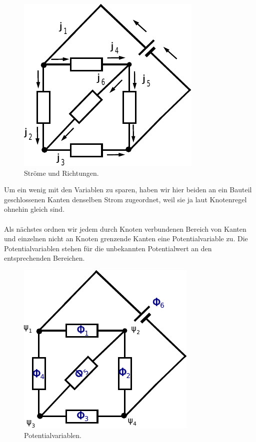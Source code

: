 \documentclass[11pt,a4paper,leqno]{report}
\numberwithin{equation}{chapter}
\begin{document}
\begin{figure}[H]
	\begin{center}
		\includegraphics[scale=0.8]{Bilder/stromkreis_2.pdf}
		\caption{Str\"ome und Richtungen.}
	\end{center}
\end{figure}
\noindent
Um ein wenig mit den Variablen zu sparen, haben wir hier beiden an ein Bauteil geschlossenen Kanten denselben Strom zugeordnet, weil sie ja laut Knotenregel ohnehin gleich sind.\\
\\
Als n\"achstes ordnen wir jedem durch Knoten verbundenen Bereich von Kanten und einzelnen nicht an Knoten grenzende Kanten eine Potentialvariable zu. Die Potentialvariablen stehen f\"ur die unbekannten Potentialwert an den entsprechenden Bereichen.
\begin{figure}[H]
	\begin{center}
		\includegraphics[scale=0.8]{Bilder/stromkreis_3.pdf}
		\caption{Potentialvariablen.}
	\end{center}
\end{figure}
\end{document}
